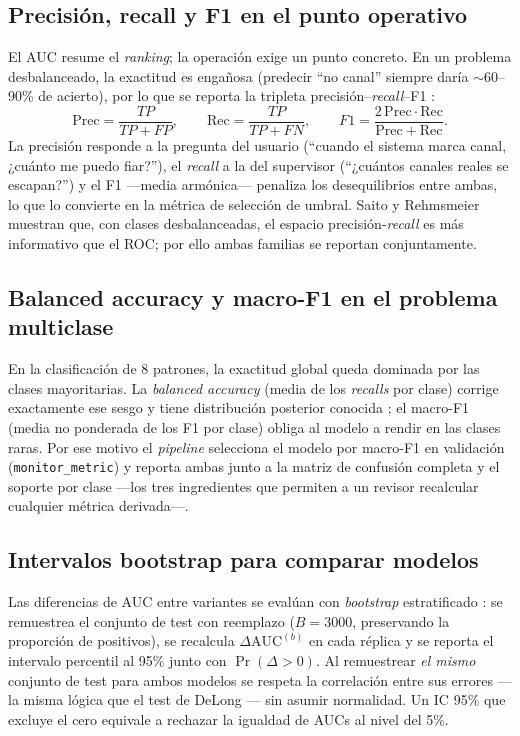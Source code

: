 \documentclass[11pt,a4paper]{article}
\begin{document}
\subsection{Precisión, recall y F1 en el punto operativo}
El AUC resume el \emph{ranking}; la operación exige un punto concreto. En un
problema desbalanceado, la exactitud es engañosa (predecir ``no canal'' siempre
daría $\sim$60--90\% de acierto), por lo que se reporta la tripleta
precisión--\emph{recall}--F1 \cite{powers2011evaluation,saito2015precision}:
\begin{equation}
\mathrm{Prec} = \frac{TP}{TP+FP}, \qquad
\mathrm{Rec} = \frac{TP}{TP+FN}, \qquad
F1 = \frac{2\,\mathrm{Prec}\cdot\mathrm{Rec}}{\mathrm{Prec}+\mathrm{Rec}}.
\end{equation}
La precisión responde a la pregunta del usuario (``cuando el sistema marca canal,
¿cuánto me puedo fiar?''), el \emph{recall} a la del supervisor (``¿cuántos
canales reales se escapan?'') y el F1 —media armónica— penaliza los desequilibrios
entre ambas, lo que lo convierte en la métrica de selección de umbral. Saito y
Rehmsmeier \cite{saito2015precision} muestran que, con clases desbalanceadas, el
espacio precisión-\emph{recall} es más informativo que el ROC; por ello ambas
familias se reportan conjuntamente.

\subsection{Balanced accuracy y macro-F1 en el problema multiclase}
En la clasificación de 8 patrones, la exactitud global queda dominada por las
clases mayoritarias. La \emph{balanced accuracy} (media de los \emph{recalls} por
clase) corrige exactamente ese sesgo y tiene distribución posterior conocida
\cite{brodersen2010balanced}; el macro-F1 (media no ponderada de los F1 por
clase) obliga al modelo a rendir en las clases raras. Por ese motivo el
\emph{pipeline} selecciona el modelo por macro-F1 en validación
(\texttt{monitor\_metric}) y reporta ambas junto a la matriz de confusión
completa y el soporte por clase —los tres ingredientes que permiten a un revisor
recalcular cualquier métrica derivada—.

\subsection{Intervalos bootstrap para comparar modelos}
\label{ap:bootstrap}
Las diferencias de AUC entre variantes se evalúan con \emph{bootstrap}
estratificado \cite{efron1994introduction}: se remuestrea el conjunto de test
con reemplazo ($B=3000$, preservando la proporción de positivos), se recalcula
$\Delta\mathrm{AUC}^{(b)}$ en cada réplica y se reporta el intervalo percentil
al 95\% junto con $\Pr(\Delta>0)$. Al remuestrear \emph{el mismo} conjunto de
test para ambos modelos se respeta la correlación entre sus errores
—la misma lógica que el test de DeLong \cite{delong1988comparing}— sin asumir
normalidad. Un IC 95\% que excluye el cero equivale a rechazar la igualdad de
AUCs al nivel del 5\%.
\end{document}
